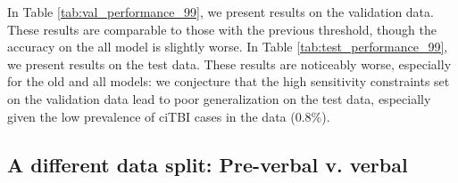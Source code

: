 \documentclass[11pt, letterpaper]{amsart}
\let\Oldsubsection\subsection
\renewcommand{\subsection}{\FloatBarrier\Oldsubsection}
\begin{document}
In Table \ref{tab:val_performance_99}, we present results on the validation data. These results are comparable to those with the previous threshold, though the accuracy on the all model is slightly worse. In Table \ref{tab:test_performance_99}, we present results on the test data. These results are noticeably worse, especially for the old and all models: we conjecture that the high sensitivity constraints set on the validation data lead to poor generalization on the test data, especially given the low prevalence of ciTBI cases in the data (0.8\%). 
\begin{table}[h]
\caption{Algorithm performance on validation data for each data split with a differently set threshold (0.99 sensitivity)}\label{tab:val_performance_99}
\end{table}
\begin{table}[h]
\caption{Algorithm performance on test data for each data split with a differently set threshold (0.99 sensitivity)}\label{tab:test_performance_99}
\end{table}

\subsection{A different data split: Pre-verbal v. verbal} \label{ssec:verbal}
\end{document}
